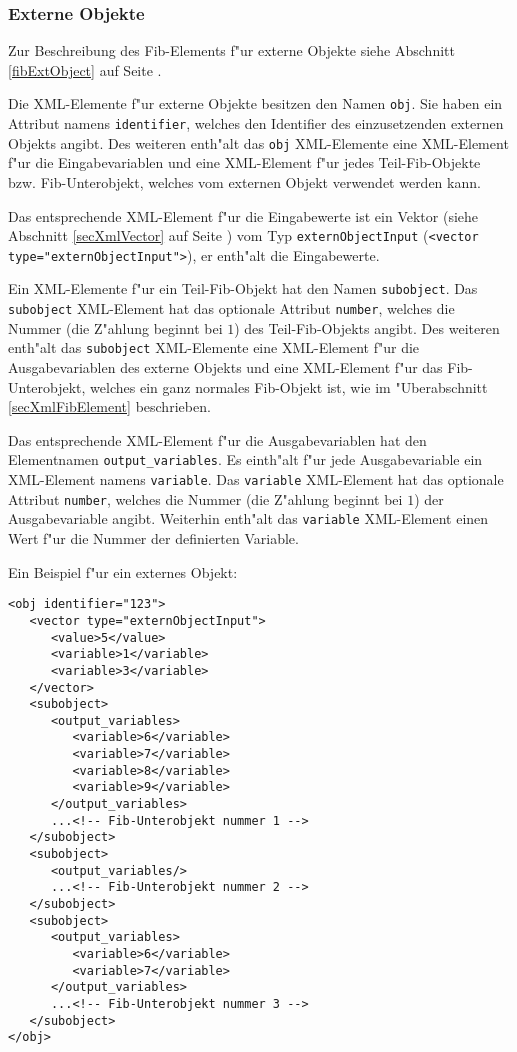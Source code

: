 

\subsubsection{Externe Objekte}

Zur Beschreibung des Fib-Elements f"ur externe Objekte siehe Abschnitt \ref{fibExtObject} auf Seite \pageref{fibExtObject} .

Die XML-Elemente f"ur externe Objekte besitzen den Namen \verb|obj|. Sie haben ein Attribut namens \verb|identifier|, welches den Identifier des einzusetzenden externen Objekts angibt. Des weiteren enth"alt das \verb|obj| XML-Elemente eine XML-Element f"ur die Eingabevariablen und eine XML-Element f"ur jedes Teil-Fib-Objekte bzw. Fib-Unterobjekt, welches vom externen Objekt verwendet werden kann.

Das entsprechende XML-Element f"ur die Eingabewerte ist ein Vektor (siehe Abschnitt \ref{secXmlVector} auf Seite \pageref{secXmlVector}) vom Typ \verb|externObjectInput| (\verb|<vector| \verb| type=|\verb|"externObjectInput">|), er enth"alt die Eingabewerte.

Ein XML-Elemente f"ur ein Teil-Fib-Objekt hat den Namen \verb|subobject|. Das \verb|subobject| XML-Element hat das optionale Attribut \verb|number|, welches die Nummer (die Z"ahlung beginnt bei $1$) des Teil-Fib-Objekts angibt. Des weiteren enth"alt das \verb|subobject| XML-Elemente eine XML-Element f"ur die Ausgabevariablen des externe Objekts und eine XML-Element f"ur das Fib-Unterobjekt, welches ein ganz normales Fib-Objekt ist, wie im "Uberabschnitt \ref{secXmlFibElement} beschrieben.

Das entsprechende XML-Element f"ur die Ausgabevariablen hat den Elementnamen \verb|output_variables|. Es einth"alt f"ur jede Ausgabevariable ein XML-Element namens \verb|variable|. Das \verb|variable| XML-Element hat das optionale Attribut \verb|number|, welches die Nummer (die Z"ahlung beginnt bei $1$) der Ausgabevariable angibt. Weiterhin enth"alt das \verb|variable| XML-Element einen Wert f"ur die Nummer der definierten Variable.

\bigskip\noindent
Ein Beispiel f"ur ein externes Objekt:
\begin{verbatim}
<obj identifier="123">
   <vector type="externObjectInput">
      <value>5</value>
      <variable>1</variable>
      <variable>3</variable>
   </vector>
   <subobject>
      <output_variables>
         <variable>6</variable>
         <variable>7</variable>
         <variable>8</variable>
         <variable>9</variable>
      </output_variables>
      ...<!-- Fib-Unterobjekt nummer 1 -->
   </subobject>
   <subobject>
      <output_variables/>
      ...<!-- Fib-Unterobjekt nummer 2 -->
   </subobject>
   <subobject>
      <output_variables>
         <variable>6</variable>
         <variable>7</variable>
      </output_variables>
      ...<!-- Fib-Unterobjekt nummer 3 -->
   </subobject>
</obj>
\end{verbatim}

